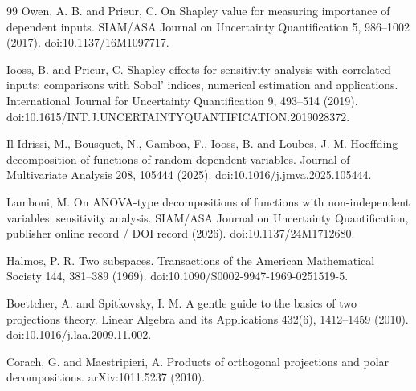 \documentclass[11pt]{article}
\theoremstyle{remark}
\begin{document}
\begin{thebibliography}{99}
Owen, A. B. and Prieur, C. On Shapley value for measuring importance of dependent inputs. SIAM/ASA Journal on Uncertainty Quantification 5, 986--1002 (2017). doi:10.1137/16M1097717.

Iooss, B. and Prieur, C. Shapley effects for sensitivity analysis with correlated inputs: comparisons with Sobol' indices, numerical estimation and applications. International Journal for Uncertainty Quantification 9, 493--514 (2019). doi:10.1615/INT.J.UNCERTAINTYQUANTIFICATION.2019028372.

Il Idrissi, M., Bousquet, N., Gamboa, F., Iooss, B. and Loubes, J.-M. Hoeffding decomposition of functions of random dependent variables. Journal of Multivariate Analysis 208, 105444 (2025). doi:10.1016/j.jmva.2025.105444.

Lamboni, M. On ANOVA-type decompositions of functions with non-independent variables: sensitivity analysis. SIAM/ASA Journal on Uncertainty Quantification, publisher online record / DOI record (2026). doi:10.1137/24M1712680.

Halmos, P. R. Two subspaces. Transactions of the American Mathematical Society 144, 381--389 (1969). doi:10.1090/S0002-9947-1969-0251519-5.

Boettcher, A. and Spitkovsky, I. M. A gentle guide to the basics of two projections theory. Linear Algebra and its Applications 432(6), 1412--1459 (2010). doi:10.1016/j.laa.2009.11.002.

Corach, G. and Maestripieri, A. Products of orthogonal projections and polar decompositions. arXiv:1011.5237 (2010).
\end{thebibliography}
\end{document}
